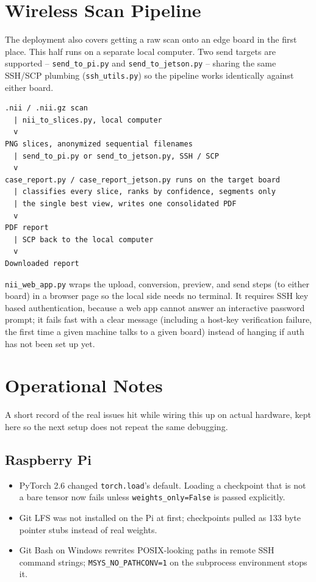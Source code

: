 \documentclass[11pt]{article}
\begin{document}
\section{Wireless Scan Pipeline}

The deployment also covers getting a raw scan onto an edge board in the first place.
This half runs on a separate local computer. Two send targets are supported --
\texttt{send\_to\_pi.py} and \texttt{send\_to\_jetson.py} -- sharing the same SSH/SCP
plumbing (\texttt{ssh\_utils.py}) so the pipeline works identically against either board.

\begin{verbatim}
.nii / .nii.gz scan
  | nii_to_slices.py, local computer
  v
PNG slices, anonymized sequential filenames
  | send_to_pi.py or send_to_jetson.py, SSH / SCP
  v
case_report.py / case_report_jetson.py runs on the target board
  | classifies every slice, ranks by confidence, segments only
  | the single best view, writes one consolidated PDF
  v
PDF report
  | SCP back to the local computer
  v
Downloaded report
\end{verbatim}

\texttt{nii\_web\_app.py} wraps the upload, conversion, preview, and send steps (to
either board) in a browser page so the local side needs no terminal. It requires SSH key
based authentication, because a web app cannot answer an interactive password prompt; it
fails fast with a clear message (including a host-key verification failure, the first
time a given machine talks to a given board) instead of hanging if auth has not been set
up yet.

\section{Operational Notes}
\label{sec:jetson-ops}

A short record of the real issues hit while wiring this up on actual hardware, kept here
so the next setup does not repeat the same debugging.

\subsection*{Raspberry Pi}
\begin{itemize}[leftmargin=1.2em]
\item PyTorch 2.6 changed \texttt{torch.load}'s default. Loading a checkpoint that is
  not a bare tensor now fails unless \texttt{weights\_only=False} is passed explicitly.
\item Git LFS was not installed on the Pi at first; checkpoints pulled as 133 byte
  pointer stubs instead of real weights.
\item Git Bash on Windows rewrites POSIX-looking paths in remote SSH command strings;
  \texttt{MSYS\_NO\_PATHCONV=1} on the subprocess environment stops it.
\end{itemize}
\end{document}
